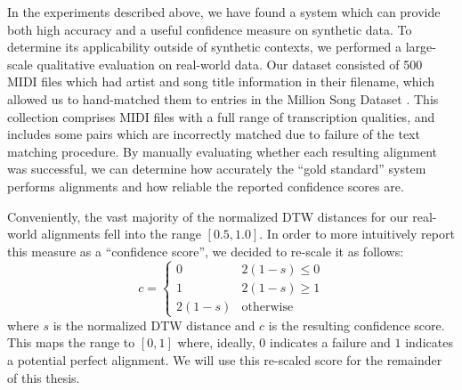In the experiments described above, we have found a system which can provide both high accuracy and a useful confidence measure on synthetic data.
To determine its applicability outside of synthetic contexts, we performed a large-scale qualitative evaluation on real-world data.
Our dataset consisted of 500 MIDI files which had artist and song title information in their filename, which allowed us to hand-matched them to entries in the Million Song Dataset \cite{bertin2011million}.
This collection comprises MIDI files with a full range of transcription qualities, and includes some pairs which are incorrectly matched due to failure of the text matching procedure.
By manually evaluating whether each resulting alignment was successful, we can determine how accurately the ``gold standard'' system performs alignments and how reliable the reported confidence scores are.

Conveniently, the vast majority of the normalized DTW distances for our real-world alignments fell into the range $[0.5, 1.0]$.
In order to more intuitively report this measure as a ``confidence score'', we decided to re-scale it as follows:
\begin{equation}
        c = \begin{cases}
                0 & 2(1 - s) \le 0\\
                1 & 2(1 - s) \ge 1\\
                2(1 - s) & \mathrm{otherwise}
        \end{cases}
\end{equation}
where $s$ is the normalized DTW distance and $c$ is the resulting confidence score.
This maps the range to $[0, 1]$ where, ideally, $0$ indicates a failure and $1$ indicates a potential perfect alignment.
We will use this re-scaled score for the remainder of this thesis.

